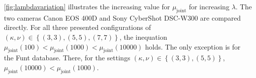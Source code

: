 \autoref{fig:lambdavariation} illustrates the increasing value for $\mu_\text{joint}$ for increasing $\lambda$. The two cameras Canon EOS 400D and Sony CyberShot DSC-W300 are compared directly. For all three presented configurations of $(\kappa, \nu) \in \left\{(3,3), (5,5), (7,7)\right\}$, the inequation $\mu_\text{joint}(100) < \mu_\text{joint}(1000) < \mu_\text{joint}(10000)$ holds. The only exception is for the Funt database. There, for the settings $(\kappa,\nu) \in \left\{ (3,3), (5,5) \right\}$, $\mu_\text{joint}(10000) < \mu_\text{joint}(1000)$.
\begin{figure}[btp]
  \centering
\end{figure}
